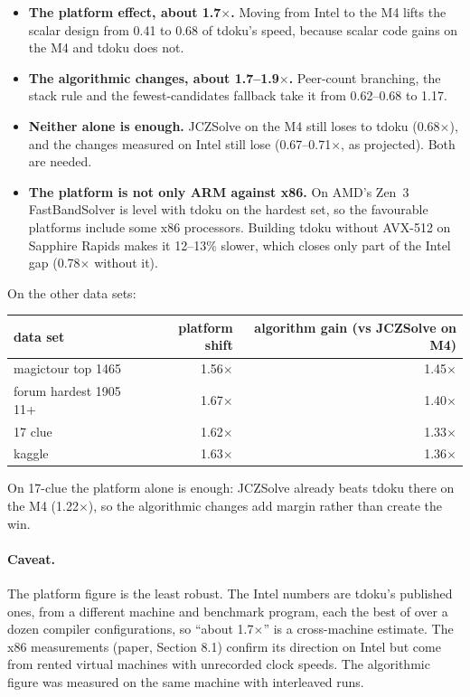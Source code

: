 \documentclass[11pt]{article}
\begin{document}
\begin{itemize}
\item \textbf{The platform effect, about 1.7$\times$.} Moving from Intel to the M4 lifts the scalar design from 0.41 to
  0.68 of tdoku's speed, because scalar code gains on the M4 and tdoku does not.
\item \textbf{The algorithmic changes, about 1.7--1.9$\times$.} Peer-count branching, the stack rule and the
  fewest-candidates fallback take it from 0.62--0.68 to 1.17.
\item \textbf{Neither alone is enough.} JCZSolve on the M4 still loses to tdoku (0.68$\times$), and the changes
  measured on Intel still lose (0.67--0.71$\times$, as projected). Both are needed.
\item \textbf{The platform is not only ARM against x86.} On AMD's Zen~3 FastBandSolver is level with tdoku on the
  hardest set, so the favourable platforms include some x86 processors. Building tdoku without AVX-512 on Sapphire
  Rapids makes it 12--13\% slower, which closes only part of the Intel gap (0.78$\times$ without it).
\end{itemize}

On the other data sets:

\begin{center}
\begin{tabular}{lrr}
\toprule
data set & platform shift & algorithm gain (vs JCZSolve on M4) \\
\midrule
magictour top 1465 & 1.56$\times$ & 1.45$\times$ \\
forum hardest 1905 11+ & 1.67$\times$ & 1.40$\times$ \\
17 clue & 1.62$\times$ & 1.33$\times$ \\
kaggle & 1.63$\times$ & 1.36$\times$ \\
\bottomrule
\end{tabular}
\end{center}

On 17-clue the platform alone is enough: JCZSolve already beats tdoku there on the M4 (1.22$\times$), so the
algorithmic changes add margin rather than create the win.

\paragraph{Caveat.} The platform figure is the least robust. The Intel numbers are tdoku's published ones, from a
different machine and benchmark program, each the best of over a dozen compiler configurations, so ``about
1.7$\times$'' is a cross-machine estimate. The x86 measurements (paper, Section 8.1) confirm its direction on Intel
but come from rented virtual machines with unrecorded clock speeds. The algorithmic figure was measured on the same machine with interleaved
runs.
\end{document}
